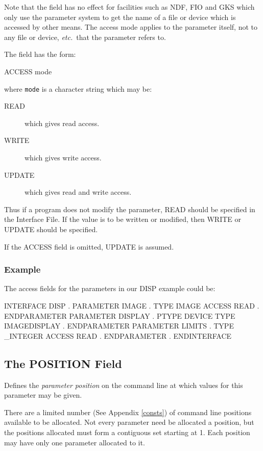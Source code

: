 \documentclass[twoside,11pt,nolof]{starlink}
\begin{document}
Note that the field has no effect for facilities such as NDF, FIO and GKS
which only use the parameter system to get the name of a file or device which
is accessed by other means. The access mode applies to the parameter itself,
not to any file or device, \emph{etc.}\ that the parameter refers to.

The field has the form:
\begin{terminalv}
ACCESS mode
\end{terminalv}
where \texttt{mode} is a character string which may be:
\begin{description}
\item[READ] which gives read access.
\item[WRITE] which gives write access.
\item[UPDATE] which gives read and write access.
\end{description}

Thus if a program does not modify the parameter,
READ should be specified in the Interface File.
If the value is to be written or modified, then WRITE or UPDATE
should be specified.

If the ACCESS field is omitted, UPDATE is assumed.

\subsubsection*{Example}
The access fields for the parameters in our DISP example could be:
\begin{terminalv}
INTERFACE DISP
   .
   PARAMETER IMAGE
         .
      TYPE IMAGE
      ACCESS READ
         .
   ENDPARAMETER
   PARAMETER DISPLAY
         .
      PTYPE DEVICE
      TYPE IMAGEDISPLAY
         .
   ENDPARAMETER
   PARAMETER LIMITS
         .
      TYPE _INTEGER
      ACCESS READ
         .
   ENDPARAMETER
      .
ENDINTERFACE
\end{terminalv}

\subsection{The POSITION Field}

Defines the \emph{parameter position} on the command line at which values for
this parameter may be given.

There are a limited number (See Appendix \ref{consts}) of
command line positions available to be allocated. Not every parameter need
be allocated a position, but the positions allocated must form a contiguous
set starting at 1.
Each position may have only one parameter allocated to it.
\end{document}
